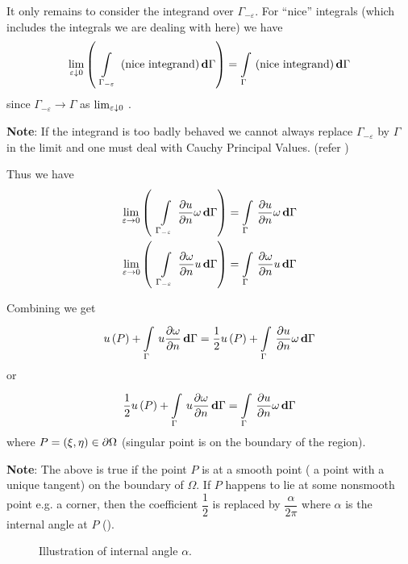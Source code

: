 It only remains to consider the integrand over $\Gamma_{-\varepsilon}$.  For
``nice'' integrals (which includes the integrals we are dealing with here) we
have
\begin{equation*}
  \limita{\varepsilon}{0}\pbrac{\gint{\;\; \Gamma_{-\varepsilon}}{}
    {\text{(nice integrand)}}{\Gamma}} = \gint{\Gamma}{}{\text{(nice
    integrand)}}{\Gamma} 
\end{equation*}
since $\Gamma_{-\varepsilon} \rightarrow \Gamma$ as $\limita{\varepsilon}{0}$.

\textbf{Note}: If the integrand is too badly behaved we cannot always
replace $\Gamma_{-\varepsilon}$ by $\Gamma$ in the limit and one must deal
with Cauchy Principal Values.  (refer )

Thus we have
\begin{align}
  \lim_{\varepsilon \rightarrow 0}\left( \;\;  \displaystyle\int\limits_{\Gamma_{-\varepsilon}}^{} \, \dfrac{\partial u}{\partial n}  \omega\, \boldsymbol{\mathrm{d}} \Gamma  \right) &=   \displaystyle\int\limits_{\Gamma}^{} \, \dfrac{\partial u}{\partial n}  \omega\, \boldsymbol{\mathrm{d}} \Gamma   
  \label{eqn:integ3} \\
  \lim_{\varepsilon \rightarrow 0}\left( \;\;  \displaystyle\int\limits_{\Gamma_{-\varepsilon}}^{} \, \dfrac{\partial \omega}{\partial n}  u\, \boldsymbol{\mathrm{d}} \Gamma  \right) &=   \displaystyle\int\limits_{\Gamma}^{} \, \dfrac{\partial \omega}{\partial n}  u\, \boldsymbol{\mathrm{d}} \Gamma   
  \label{eqn:integ4}
\end{align}

Combining  we get
\begin{equation*}
   u\left( P \right)  +    \displaystyle\int\limits_{\Gamma}^{} \,u  \dfrac{\partial \omega}{\partial n} \, \boldsymbol{\mathrm{d}} \Gamma   
  = \dfrac{1}{2}  u\left( P \right)  +    \displaystyle\int\limits_{\Gamma}^{} \, \dfrac{\partial u}{\partial n}  \omega\, \boldsymbol{\mathrm{d}} \Gamma  
\end{equation*} 
or
\begin{equation*}
  \dfrac{1}{2}  u\left( P \right)  +    \displaystyle\int\limits_{\Gamma}^{} \,u  \dfrac{\partial \omega}{\partial n} \, \boldsymbol{\mathrm{d}} \Gamma    = 
     \displaystyle\int\limits_{\Gamma}^{} \, \dfrac{\partial u}{\partial n}  \omega\, \boldsymbol{\mathrm{d}} \Gamma   
\end{equation*}
where $P = \left( \xi,\eta \right) \in \partial \Omega$ (\ie singular point is on the boundary
of the region).

\textbf{Note}: The above is true if the point $P$ is at a smooth point (\ie
a point with a unique tangent) on the boundary of $\Omega$.  If $P$ happens to
lie at some nonsmooth point e.g. a corner, then the coefficient $\dfrac{1}{2}$
is replaced by $\dfrac{\alpha}{2 \pi}$ where $\alpha$ is the internal angle at
$P$ ().

\begin{figure}[htbp] \centering
  
  \caption{Illustration of internal angle $\alpha$.}
  \label{fig:intang}
\end{figure}

